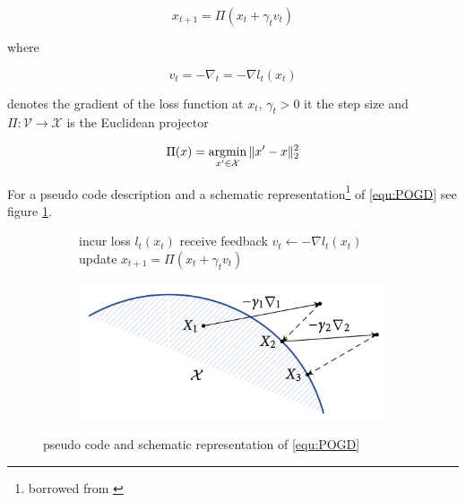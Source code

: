 \begin{equation}
   \tag{POGD}
        x_{t+1} = \Pi(x_t + \gamma_t v_t)
   \label{equ:POGD}
\end{equation}

where

\begin{equation}
    v_t = -\nabla_t = -\nabla l_t(x_t)
    \label{equ:gradient}
\end{equation}

denotes the gradient of the loss function at $x_t$, $\gamma_t > 0 $ it the step size and $\Pi: \mathcal{V} \to \mathcal{X}$ is the Euclidean projector 

\begin{equation*}
    \Pi(x) = \operatorname*{\arg\!\min}_{x'\in \mathcal{X}}\|x'-x\|_2^{2}
\end{equation*}

For a pseudo code description and a schematic representation\footnote{borrowed from \cite[Chapter 2]{HDRmertikopoulos}} of \ref{equ:POGD} see figure \ref{fig:POGDpseudoCodeAndScheme}.

\begin{figure}[H]
\centering
\begin{subfigure}{.5\textwidth}
    \begin{algorithm}[H]
    \DontPrintSemicolon
     {
    incur loss $l_t(x_t)$ \;
    receive feedback $v_t \gets -\nabla l_t(x_t)$ \;
    update $x_{t+1} = \Pi(x_t + \gamma_t v_t)$ \;
    }
    \end{algorithm}
\end{subfigure}%
\begin{subfigure}{.5\textwidth}
  \centering
  \includegraphics[width=\textwidth]{logos/POGDscheme.png}
\end{subfigure}
\caption{pseudo code and schematic representation of \ref{equ:POGD}}
\label{fig:POGDpseudoCodeAndScheme}
\end{figure}

